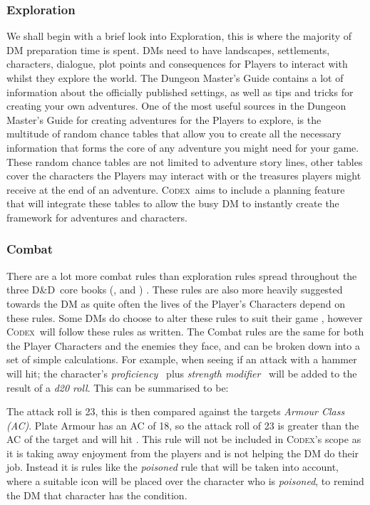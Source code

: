 \documentclass[review]{cmpreport}
\newcommand{\dnd}{D\&D}
\newcommand{\Codex}{\textsc{Codex}}
\begin{document}
	\subsubsection{Exploration}
	We shall begin with a brief look into Exploration, this is where the majority of DM preparation time is spent. DMs need to have landscapes, settlements, characters, dialogue, plot points and consequences for Players to interact with whilst they explore the world. The Dungeon Master's Guide \citep{DMGuide} contains a lot of information about the officially published settings, as well as tips and tricks for creating your own adventures. One of the most useful sources in the Dungeon Master's Guide for creating adventures for the Players to explore, is the multitude of random chance tables that allow you to create all the necessary information that forms the core of any adventure you might need for your game. These random chance tables are not limited to adventure story lines, other tables cover the characters the Players may interact with or the treasures players might receive at the end of an adventure. \Codex \ aims to include a planning feature that will integrate these tables to allow the busy DM to instantly create the framework for adventures and characters. 
	
	\subsubsection{Combat}
	There are a lot more combat rules than exploration rules spread throughout the three \dnd \ core books (\cite{DMGuide}, \cite{MonsterManual} and \cite{PlayerHandbook}) . These rules are also more heavily suggested towards the DM as quite often the lives of the Player's Characters depend on these rules. Some DMs do choose to alter these rules to suit their game \citep{Personal}, however \Codex \ will follow these rules as written. The Combat rules are the same for both the Player Characters and the enemies they face, and can be broken down into a set of simple calculations. For example, when seeing if an attack with a hammer will hit; the character's \emph{proficiency} \ plus \emph{strength modifier} \ will be added to the result of a \emph{d20 roll}. This can be summarised to be:

	The attack roll is 23, this is then compared against the targets \emph{Armour Class (AC)}. Plate Armour has an AC of 18, so the attack roll of 23 is greater than the AC of the target and will hit \citep{PlayerHandbook}. This rule will not be included in \Codex's scope as it is taking away enjoyment from the players and is not helping the DM do their job. Instead it is rules like the \emph{poisoned} rule that will be taken into account, where a suitable icon will be placed over the character who is \emph{poisoned}, to remind the DM that  character has the condition.
	
\end{document}
